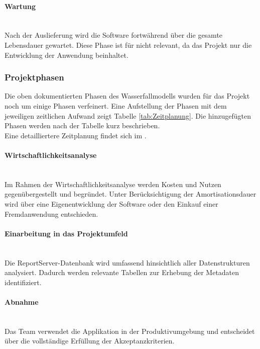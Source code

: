 \paragraph{Wartung}~\\\label{p:Wartung}
Nach der Auslieferung wird die Software fortwährend über die gesamte Lebensdauer gewartet. Diese Phase ist für \projektName nicht relevant, da das Projekt nur die Entwicklung der Anwendung beinhaltet.

\subsubsection{Projektphasen}\label{sec:Projektphasen}
Die oben dokumentierten Phasen des Wasserfallmodells wurden für das Projekt noch um einige Phasen verfeinert. Eine Aufstellung der Phasen mit dem jeweiligen zeitlichen Aufwand zeigt Tabelle \ref{tab:Zeitplanung}. Die hinzugefügten Phasen werden nach der Tabelle kurz beschrieben.
\\
Eine detailliertere Zeitplanung findet sich im .

\paragraph{Wirtschaftlichkeitsanalyse}~\\\label{p:Wirtschaftlichkeitsanalyse}
Im Rahmen der Wirtschaftlichkeitsanalyse werden Kosten und Nutzen gegenübergestellt und begründet. Unter Berücksichtigung der Amortisationsdauer wird über eine Eigenentwicklung der Software oder den Einkauf einer Fremdanwendung entschieden.

\paragraph{Einarbeitung in das Projektumfeld}~\\\label{p:EinarbeitungProjektumfeld}
Die ReportServer-Datenbank wird umfassend hinsichtlich aller Datenstrukturen analysiert. Dadurch werden relevante Tabellen zur Erhebung der Metadaten identifiziert.

\paragraph{Abnahme}~\\\label{p:Abnahme}
Das Team \teamName verwendet die Applikation in der Produktivumgebung und entscheidet über die vollständige Erfüllung der Akzeptanzkriterien.

